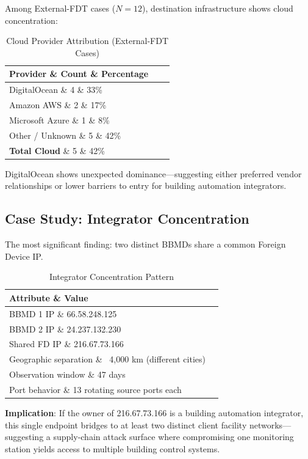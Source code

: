 \documentclass[11pt,a4paper]{article}
\begin{document}
Among External-FDT cases ($N=12$), destination infrastructure shows 
cloud concentration:

\begin{table}[h]
\centering
\begin{tabular}{lcc}
\toprule
\textbf{Provider} \& \textbf{Count} \& \textbf{Percentage} \\
\midrule
DigitalOcean \& 4 \& 33\% \\
Amazon AWS \& 2 \& 17\% \\
Microsoft Azure \& 1 \& 8\% \\
Other / Unknown \& 5 \& 42\% \\
\midrule
\textbf{Total Cloud} \& 5 \& 42\% \\
\bottomrule
\end{tabular}
\caption{Cloud Provider Attribution (External-FDT Cases)}
\label{tab:clouds}
\end{table}

DigitalOcean shows unexpected dominance---suggesting either 
preferred vendor relationships or lower barriers to entry for 
building automation integrators.

\subsection{Case Study: Integrator Concentration}

The most significant finding: two distinct BBMDs share a common 
Foreign Device IP.

\begin{table}[h]
\centering
\begin{tabular}{ll}
\toprule
\textbf{Attribute} \& \textbf{Value} \\
\midrule
BBMD 1 IP \& 66.58.248.125 \\
BBMD 2 IP \& 24.237.132.230 \\
Shared FD IP \& 216.67.73.166 \\
Geographic separation \& ~4,000 km (different cities) \\
Observation window \& 47 days \\
Port behavior \& 13 rotating source ports each \\
\bottomrule
\end{tabular}
\caption{Integrator Concentration Pattern}
\label{tab:concentration}
\end{table}

\textbf{Implication}: If the owner of 216.67.73.166 is a building 
automation integrator, this single endpoint bridges to at least 
two distinct client facility networks---suggesting a supply-chain 
attack surface where compromising one monitoring station yields 
access to multiple building control systems.
\end{document}
